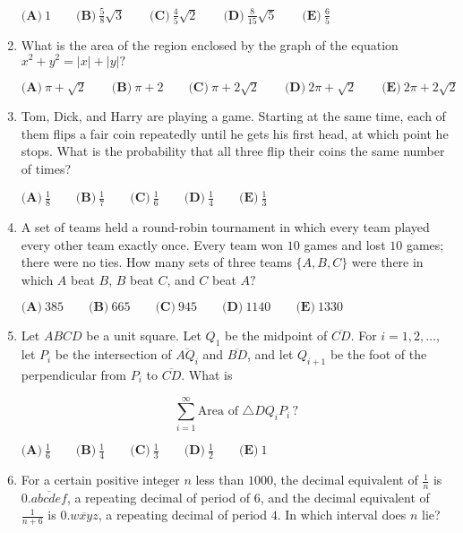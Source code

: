 \documentclass{article}
\begin{document}
\begin{enumerate}[label=\arabic*., itemsep=0.5em]
$\textbf{(A)}\ 1 \qquad
\textbf{(B)}\ \frac{5}{8}\sqrt{3} \qquad
\textbf{(C)}\ \frac{4}{5}\sqrt{2} \qquad
\textbf{(D)}\ \frac{8}{15}\sqrt{5} \qquad
\textbf{(E)}\ \frac{6}{5}$\par \vspace{0.5em}\item What is the area of the region enclosed by the graph of the equation $x^2+y^2=|x|+|y|?$

$\textbf{(A)}\ \pi+\sqrt{2} \qquad\textbf{(B)}\ \pi+2 \qquad\textbf{(C)}\ \pi+2\sqrt{2} \qquad\textbf{(D)}\ 2\pi+\sqrt{2} \qquad\textbf{(E)}\ 2\pi+2\sqrt{2}$\par \vspace{0.5em}\item Tom, Dick, and Harry are playing a game. Starting at the same time, each of them flips a fair coin repeatedly until he gets his first head, at which point he stops. What is the probability that all three flip their coins the same number of times?

$\textbf{(A)}\ \frac{1}{8} \qquad
\textbf{(B)}\ \frac{1}{7} \qquad
\textbf{(C)}\ \frac{1}{6} \qquad
\textbf{(D)}\ \frac{1}{4} \qquad
\textbf{(E)}\ \frac{1}{3}$\par \vspace{0.5em}\item A set of teams held a round-robin tournament in which every team played every other team exactly once. Every team won $10$ games and lost $10$ games; there were no ties. How many sets of three teams $\{A, B, C\}$ were there in which $A$ beat $B$, $B$ beat $C$, and $C$ beat $A?$

$\textbf{(A)}\ 385 \qquad
\textbf{(B)}\ 665 \qquad
\textbf{(C)}\ 945 \qquad
\textbf{(D)}\ 1140 \qquad
\textbf{(E)}\ 1330$\par \vspace{0.5em}\item Let $ABCD$ be a unit square. Let $Q_1$ be the midpoint of $\overline{CD}$. For $i=1,2,\dots,$ let $P_i$ be the intersection of $\overline{AQ_i}$ and $\overline{BD}$, and let $Q_{i+1}$ be the foot of the perpendicular from $P_i$ to $\overline{CD}$. What is 

\begin{equation*}
\sum_{i=1}^{\infty} \text{Area of } \triangle DQ_i P_i \, ?
\end{equation*}


$\textbf{(A)}\ \frac{1}{6} \qquad
\textbf{(B)}\ \frac{1}{4} \qquad
\textbf{(C)}\ \frac{1}{3} \qquad
\textbf{(D)}\ \frac{1}{2} \qquad
\textbf{(E)}\ 1$\par \vspace{0.5em}\item For a certain positive integer $n$ less than $1000$, the decimal equivalent of $\frac{1}{n}$ is $0.\overline{abcdef}$, a repeating decimal of period of $6$, and the decimal equivalent of $\frac{1}{n+6}$ is $0.\overline{wxyz}$, a repeating decimal of period $4$. In which interval does $n$ lie?


\end{enumerate}
\end{document}
